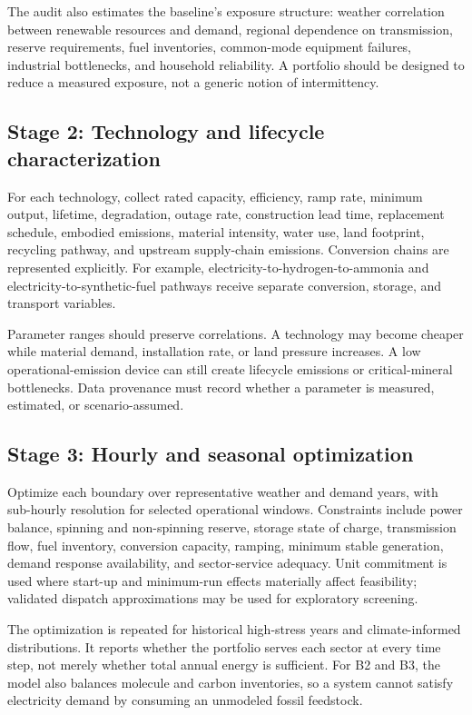 \documentclass[conference]{IEEEtran}
\begin{document}
The audit also estimates the baseline's exposure structure: weather correlation between renewable resources and demand, regional dependence on transmission, reserve requirements, fuel inventories, common-mode equipment failures, industrial bottlenecks, and household reliability. A portfolio should be designed to reduce a measured exposure, not a generic notion of intermittency.

\subsection{Stage 2: Technology and lifecycle characterization}
For each technology, collect rated capacity, efficiency, ramp rate, minimum output, lifetime, degradation, outage rate, construction lead time, replacement schedule, embodied emissions, material intensity, water use, land footprint, recycling pathway, and upstream supply-chain emissions. Conversion chains are represented explicitly. For example, electricity-to-hydrogen-to-ammonia and electricity-to-synthetic-fuel pathways receive separate conversion, storage, and transport variables.

Parameter ranges should preserve correlations. A technology may become cheaper while material demand, installation rate, or land pressure increases. A low operational-emission device can still create lifecycle emissions or critical-mineral bottlenecks. Data provenance must record whether a parameter is measured, estimated, or scenario-assumed.

\subsection{Stage 3: Hourly and seasonal optimization}
Optimize each boundary over representative weather and demand years, with sub-hourly resolution for selected operational windows. Constraints include power balance, spinning and non-spinning reserve, storage state of charge, transmission flow, fuel inventory, conversion capacity, ramping, minimum stable generation, demand response availability, and sector-service adequacy. Unit commitment is used where start-up and minimum-run effects materially affect feasibility; validated dispatch approximations may be used for exploratory screening.

The optimization is repeated for historical high-stress years and climate-informed distributions. It reports whether the portfolio serves each sector at every time step, not merely whether total annual energy is sufficient. For B2 and B3, the model also balances molecule and carbon inventories, so a system cannot satisfy electricity demand by consuming an unmodeled fossil feedstock.
\end{document}
